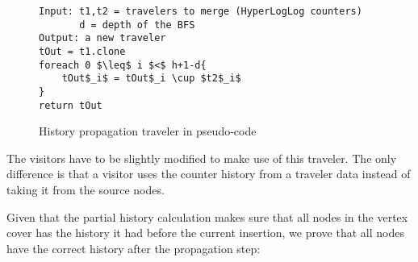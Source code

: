 \begin{figure}[h]
    \begin{lstlisting}[mathescape]
Input: t1,t2 = travelers to merge (HyperLogLog counters)
       d = depth of the BFS
Output: a new traveler
tOut = t1.clone
foreach 0 $\leq$ i $<$ h+1-d{
    tOut$_i$ = tOut$_i \cup $t2$_i$
}
return tOut
    \end{lstlisting}
    \caption{History propagation traveler in pseudo-code}
    \label{fig:history_propagation_traveler}
\end{figure}

The visitors have to be slightly modified to make use of this traveler. The only difference is that a visitor uses the counter history from a traveler data instead of taking it from the source nodes.

Given that the partial history calculation makes sure that all nodes in the vertex cover has the history it had before the current insertion, we prove that all nodes  have the correct history after the propagation step: \\



